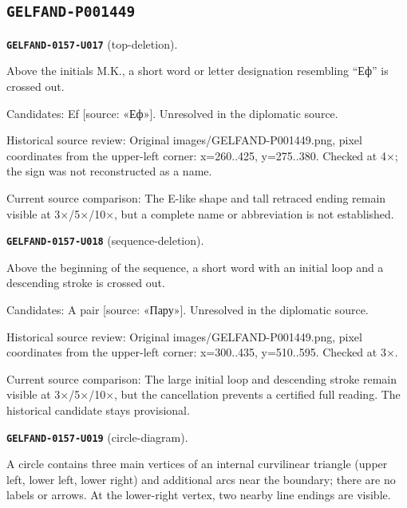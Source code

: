 \subsection*{\texttt{GELFAND-P001449}}
\par\noindent\leavevmode{}\label{GELFAND-0157-U017}\label{GELFAND-P001449:top-deletion}\textbf{\texttt{GELFAND-0157-U017}} (top-deletion).\nopagebreak[4]\par
Above the initials M.K., a short word or letter designation resembling “Еф” is crossed out.\par
Candidates: Ef [source: «Еф»]. Unresolved in the diplomatic source.\par
Historical source review: Original images/GELFAND-P001449.png, pixel coordinates from the upper-left corner: x=260..425, y=275..380. Checked at 4×; the sign was not reconstructed as a name.\par
Current source comparison: The E-like shape and tall retraced ending remain visible at 3×/5×/10×, but a complete name or abbreviation is not established.\par\medskip
\par\noindent\leavevmode{}\label{GELFAND-0157-U018}\label{GELFAND-P001449:sequence-deletion}\textbf{\texttt{GELFAND-0157-U018}} (sequence-deletion).\nopagebreak[4]\par
Above the beginning of the sequence, a short word with an initial loop and a descending stroke is crossed out.\par
Candidates: A pair [source: «Пару»]. Unresolved in the diplomatic source.\par
Historical source review: Original images/GELFAND-P001449.png, pixel coordinates from the upper-left corner: x=300..435, y=510..595. Checked at 3×.\par
Current source comparison: The large initial loop and descending stroke remain visible at 3×/5×/10×, but the cancellation prevents a certified full reading. The historical candidate stays provisional.\par\medskip
\par\noindent\leavevmode{}\label{GELFAND-0157-U019}\label{GELFAND-P001449:circle-diagram}\textbf{\texttt{GELFAND-0157-U019}} (circle-diagram).\nopagebreak[4]\par
A circle contains three main vertices of an internal curvilinear triangle (upper left, lower left, lower right) and additional arcs near the boundary; there are no labels or arrows. At the lower-right vertex, two nearby line endings are visible.\par
